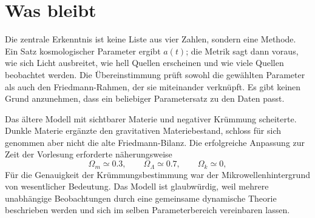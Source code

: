 \begin{classroomqa}
\end{classroomqa}

\section{Was bleibt}

Die zentrale Erkenntnis ist keine Liste aus vier Zahlen, sondern eine Methode. Ein Satz kosmologischer Parameter ergibt \(a(t)\); die Metrik sagt dann voraus, wie sich Licht ausbreitet, wie hell Quellen erscheinen und wie viele Quellen beobachtet werden. Die Übereinstimmung prüft sowohl die gewählten Parameter als auch den Friedmann-Rahmen, der sie miteinander verknüpft. Es gibt keinen Grund anzunehmen, dass ein beliebiger Parametersatz zu den Daten passt.

Das ältere Modell mit sichtbarer Materie und negativer Krümmung scheiterte. Dunkle Materie ergänzte den gravitativen Materiebestand, schloss für sich genommen aber nicht die alte Friedmann-Bilanz. Die erfolgreiche Anpassung zur Zeit der Vorlesung erforderte näherungsweise
\begin{equation}
\Omega_m\simeq0.3,
\qquad
\Omega_\Lambda\simeq0.7,
\qquad
\Omega_k\simeq0,
\end{equation}
Für die Genauigkeit der Krümmungsbestimmung war der Mikrowellenhintergrund von wesentlicher Bedeutung. Das Modell ist glaubwürdig, weil mehrere unabhängige Beobachtungen durch eine gemeinsame dynamische Theorie beschrieben werden und sich im selben Parameterbereich vereinbaren lassen.
